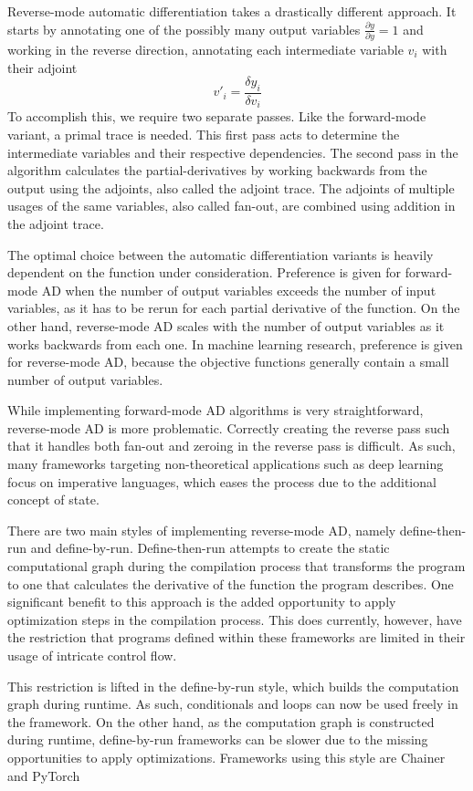 Reverse-mode automatic differentiation takes a drastically different approach.
It starts by annotating one of the possibly many output variables $\frac{\partial{y}}{\partial{y}} = 1$ and working in the reverse direction, annotating each intermediate variable $v_i$ with their adjoint
$$v'_i=\frac{\delta y_i}{\delta v_i}$$
To accomplish this, we require two separate passes.
Like the forward-mode variant, a primal trace is needed.
This first pass acts to determine the intermediate variables and their respective dependencies.
The second pass in the algorithm calculates the partial-derivatives by working backwards from the output using the adjoints, also called the adjoint trace.
The adjoints of multiple usages of the same variables, also called fan-out, are combined using addition in the adjoint trace.

The optimal choice between the automatic differentiation variants is heavily dependent on the function under consideration.
Preference is given for forward-mode AD when the number of output variables exceeds the number of input variables, as it has to be rerun for each partial derivative of the function.
On the other hand, reverse-mode AD scales with the number of output variables as it works backwards from each one.
In machine learning research, preference is given for reverse-mode AD, because the objective functions generally contain a small number of output variables.

While implementing forward-mode AD algorithms is very straightforward, reverse-mode AD is more problematic.
Correctly creating the reverse pass such that it handles both fan-out and zeroing in the reverse pass is difficult.
As such, many frameworks targeting non-theoretical applications such as deep learning focus on imperative languages, which eases the process due to the additional concept of state.

There are two main styles of implementing reverse-mode AD, namely define-then-run and define-by-run.
Define-then-run attempts to create the static computational graph during the compilation process that transforms the program to one that calculates the derivative of the function the program describes.
One significant benefit to this approach is the added opportunity to apply optimization steps in the compilation process.
This does currently, however, have the restriction that programs defined within these frameworks are limited in their usage of intricate control flow.

This restriction is lifted in the define-by-run style, which builds the computation graph during runtime.
As such, conditionals and loops can now be used freely in the framework.
On the other hand, as the computation graph is constructed during runtime, define-by-run frameworks can be slower due to the missing opportunities to apply optimizations.
Frameworks using this style are Chainer and PyTorch
